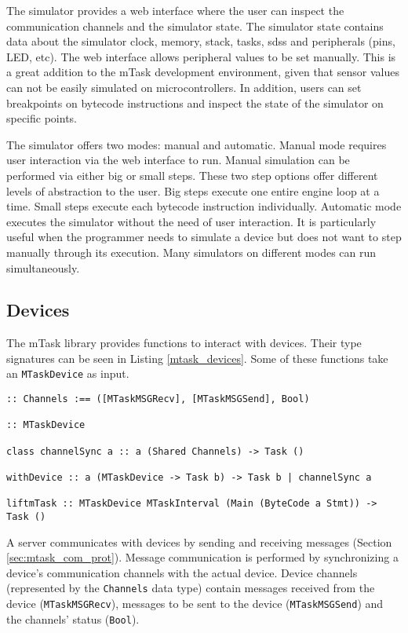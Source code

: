 The simulator provides a web interface where the user can inspect the communication channels and the simulator state. The simulator state contains data about the simulator clock, memory, stack, tasks, \acp{sds} and peripherals (pins, LED, etc). The web interface allows peripheral values to be set manually. This is a great addition to the \gls{mTask} development environment, given that sensor values can not be easily simulated on microcontrollers. In addition, users can set breakpoints on bytecode instructions and inspect the state of the simulator on specific points.

The simulator offers two modes: manual and automatic. Manual mode requires user interaction via the web interface to run. Manual simulation can be performed via either big or small steps. These two step options offer different levels of abstraction to the user. Big steps execute one entire engine loop at a time. Small steps execute each bytecode instruction individually. Automatic mode executes the simulator without the need of user interaction. It is particularly useful when the programmer needs to simulate a device but does not want to step manually through its execution. Many simulators on different modes can run simultaneously.

\subsection{Devices}\label{sec:mtask_devices}

The \gls{mTask} library provides functions to interact with devices. Their type signatures can be seen in Listing \ref{mtask_devices}. Some of these functions take an \texttt{MTaskDevice} as input. 

\begin{lstlisting}[caption=Device interaction functions,captionpos=b,label=mtask_devices]
:: Channels :== ([MTaskMSGRecv], [MTaskMSGSend], Bool)

:: MTaskDevice

class channelSync a :: a (Shared Channels) -> Task ()

withDevice :: a (MTaskDevice -> Task b) -> Task b | channelSync a

liftmTask :: MTaskDevice MTaskInterval (Main (ByteCode a Stmt)) -> Task () 
\end{lstlisting}

A server communicates with devices by sending and receiving messages (Section \ref{sec:mtask_com_prot}). Message communication is performed by synchronizing a device's communication channels with the actual device. Device channels (represented by the \texttt{Channels} data type) contain messages received from the device (\texttt{MTaskMSGRecv}), messages to be sent to the device (\texttt{MTaskMSGSend}) and the channels' status (\texttt{Bool}). 

